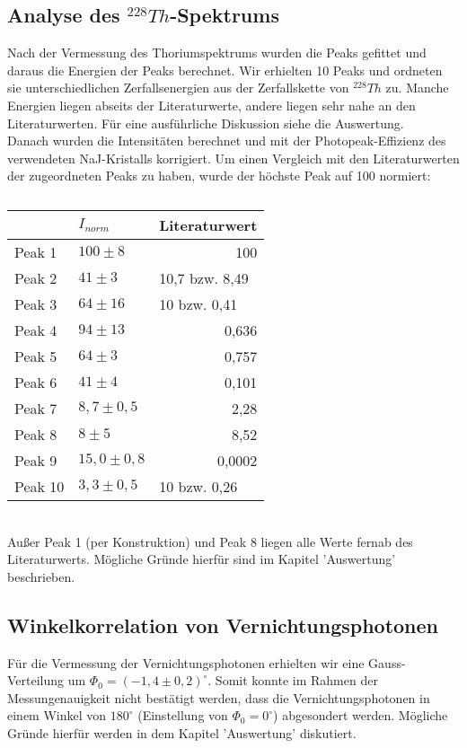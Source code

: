 \subsection{Analyse des $^{228}Th$-Spektrums}
Nach der Vermessung des Thoriumspektrums wurden die Peaks gefittet und daraus die Energien der Peaks berechnet. Wir erhielten 10 Peaks  
und ordneten sie unterschiedlichen Zerfallsenergien aus der Zerfallskette von $^{228}Th$ zu. Manche Energien liegen abseits der Literaturwerte, andere liegen sehr nahe an den Literaturwerten. Für eine ausführliche Diskussion siehe die Auswertung.\\
Danach wurden die Intensitäten berechnet und mit der Photopeak-Effizienz des verwendeten NaJ-Kristalls korrigiert. Um einen Vergleich mit den Literaturwerten der zugeordneten Peaks zu haben, wurde der höchste Peak auf 100 normiert:
\begin{table}[htbp]
\begin{center}
\caption{}
\begin{tabular}{|l|l|r|}
\hline
 & $I_{norm}$ & \multicolumn{1}{l|}{Literaturwert} \\ \hline
Peak 1 & $100\pm8$ & 100 \\ \hline
Peak 2 & $41\pm3$ & \multicolumn{1}{l|}{10,7 bzw. 8,49} \\ \hline
Peak 3 & $64\pm16$ & \multicolumn{1}{l|}{10 bzw. 0,41} \\ \hline
Peak 4 & $94\pm13$ & 0,636 \\ \hline
Peak 5 & $64\pm3$ & 0,757 \\ \hline
Peak 6 & $41\pm4$ & 0,101 \\ \hline
Peak 7 & $8,7\pm0,5$ & 2,28 \\ \hline
Peak 8 & $8\pm5$ & 8,52 \\ \hline
Peak 9 & $15,0\pm0,8$ & 0,0002 \\ \hline
Peak 10 & $3,3\pm0,5$ & \multicolumn{1}{l|}{10 bzw. 0,26} \\ \hline
\end{tabular}
\end{center}
\label{}
\end{table}
~\\
Außer Peak 1 (per Konstruktion) und Peak 8 liegen alle Werte fernab des Literaturwerts. Mögliche Gründe hierfür sind im Kapitel 'Auswertung' beschrieben.
\subsection{Winkelkorrelation von Vernichtungsphotonen}
Für die Vermessung der Vernichtungsphotonen erhielten wir eine Gauss-Verteilung um $\Phi_{0}=(-1,4\pm0,2)^{\circ}$. Somit konnte im Rahmen der Messungenauigkeit nicht bestätigt werden, dass die Vernichtungsphotonen in einem Winkel von $180^{\circ}$ (Einstellung von $\Phi_{0}=0^{\circ}$) abgesondert werden. Mögliche Gründe hierfür werden in dem Kapitel 'Auswertung' diskutiert.


